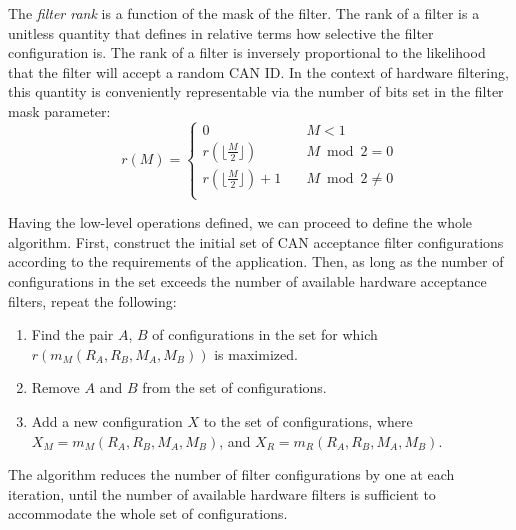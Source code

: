 The \emph{filter rank} is a function of the mask of the filter.
The rank of a filter is a unitless quantity that defines in relative terms how selective the filter configuration is.
The rank of a filter is inversely proportional to the likelihood that the filter will accept a random CAN ID.
In the context of hardware filtering, this quantity is conveniently representable via the number of bits set in
the filter mask parameter:
\begin{equation*}
r(M) =
\begin{cases}
    0                                   & \quad M < 1 \\
    r(\lfloor\frac{M}{2}\rfloor)        & \quad M \bmod 2 = 0 \\
    r(\lfloor\frac{M}{2}\rfloor) + 1    & \quad M \bmod 2 \neq 0 \\
\end{cases}
\end{equation*}

Having the low-level operations defined, we can proceed to define the whole algorithm.
First, construct the initial set of CAN acceptance filter configurations
according to the requirements of the application.
Then, as long as the number of configurations in the set exceeds the number of available hardware acceptance filters,
repeat the following:
\begin{enumerate}
    \item Find the pair $A$, $B$ of configurations in the set for which $r(m_M(R_A, R_B, M_A, M_B))$ is maximized.
    \item Remove $A$ and $B$ from the set of configurations.
    \item Add a new configuration $X$ to the set of configurations, where
    $X_M = m_M(R_A, R_B, M_A, M_B)$, and $X_R = m_R(R_A, R_B, M_A, M_B)$.
\end{enumerate}

The algorithm reduces the number of filter configurations by one at each iteration,
until the number of available hardware filters is sufficient to accommodate the whole set of configurations.
